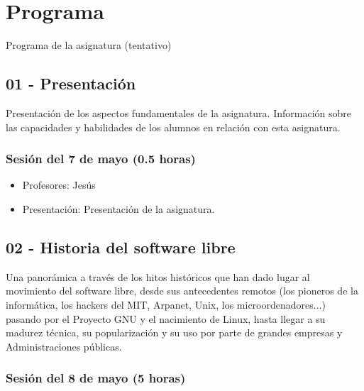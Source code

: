 \documentclass[a4paper,12pt]{article}
\begin{document}
\section{Programa}

Programa de la asignatura (tentativo)

\subsection{01 - Presentación}

Presentación de los aspectos fundamentales de la asignatura. Información sobre las capacidades y habilidades de los alumnos en relación con esta asignatura.

\subsubsection{Sesión del 7 de mayo (0.5 horas)}

\begin{itemize}
\item Profesores: Jesús
\item Presentación: Presentación de la asignatura.
\end{itemize}

\subsection{02 - Historia del software libre}

Una panorámica a través de los hitos históricos que han dado lugar al movimiento del software libre, desde sus antecedentes remotos (los pioneros de la informática, los hackers del MIT, Arpanet, Unix, los microordenadores...) pasando por el Proyecto GNU y el nacimiento de Linux, hasta llegar a su madurez técnica, su popularización y su uso por parte de grandes empresas y Administraciones públicas. 

\subsubsection{Sesión del 8 de mayo (5 horas)}
\end{document}
